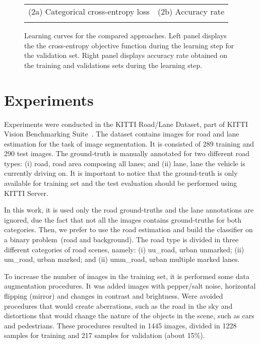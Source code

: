 \begin{figure*}[!h]
\begin{center}
\begin{tabular}{ll}
(2a) Categorical cross-entropy loss&(2b) Accuracy rate \\
&
\\
\end{tabular}%
\caption{Learning curves for the compared approaches. Left panel displays the the cross-entropy objective function during the learning step for the validation set. Right panel displays accuracy rate obtained on the training and validations sets during the learning step.}
\end{center}
\label{fig:learning}
\end{figure*}

\section{Experiments}
\label{sec:experiments}

Experiments were conducted in the KITTI Road/Lane Dataset, part of KITTI Vision Benchmarking Suite~\cite{KITTI}. The dataset  contains  images for road and lane estimation for the task of image segmentation. It is consisted of 289 training and 290 test images. The ground-truth is manually annotated for two different road types: (i) road, road area composing all lanes; and (ii) lane, lane the vehicle is currently driving on. It is important to notice that the ground-truth is only available for training set and the test evaluation should be performed using KITTI Server.

In this work, it is used only the road ground-truths and the lane annotations are ignored, due the fact that not all the images contains ground-truths for both categories. Then, we prefer to use the road estimation and build the classifier on a binary problem~(road and background). The road type is divided in three different categories of road scenes, namely: (i) uu\_road, urban unmarked; (ii) um\_road, urban marked; and (ii) umm\_road, urban multiple marked lanes.  

To increase the number of images in the training set, it is performed some data augmentation procedures. It was added images with pepper/salt noise, horizontal flipping (mirror) and  changes in contrast and brightness. Were avoided procedures that would create aberrations, such as the road in the sky and distortions that would change the nature of the objects in the scene, such as cars and pedestrians. These procedures resulted in 1445 images, divided in 1228 samples for training and 217 samples for validation (about 15\%). 


